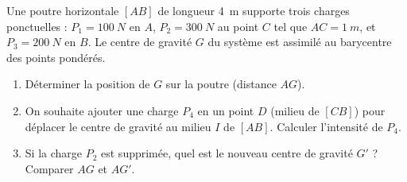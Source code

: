\documentclass[11pt]{article}
\begin{document}
\begin{exercice}
Une poutre horizontale $[AB]$ de longueur \SI{4}{m} supporte trois charges ponctuelles : $P_1 = \SI{100}{N}$ en $A$, $P_2 = \SI{300}{N}$ au point $C$ tel que $AC = \SI{1}{m}$, et $P_3 = \SI{200}{N}$ en $B$. Le centre de gravité $G$ du système est assimilé au barycentre des points pondérés.
\begin{enumerate}
    \item Déterminer la position de $G$ sur la poutre (distance $AG$).
    \item On souhaite ajouter une charge $P_4$ en un point $D$ (milieu de $[CB]$) pour déplacer le centre de gravité au milieu $I$ de $[AB]$. Calculer l'intensité de $P_4$.
    \item Si la charge $P_2$ est supprimée, quel est le nouveau centre de gravité $G'$ ? Comparer $AG$ et $AG'$.
\end{enumerate}
\end{exercice}
\end{document}
